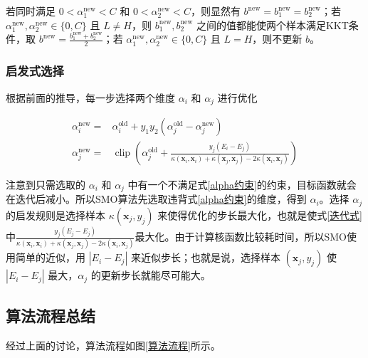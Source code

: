 \documentclass{ctexart}
\begin{document}
	若同时满足 $0<\alpha_{1}^\text{new}<C$ 和 $0<\alpha_{2}^\text{new}<C$，则显然有 $b^\text{new}=b_1^\text{new}=b_2^\text{new}$；若 $\alpha_{1}^\text{new},\alpha_{2}^\text{new}\in\{0,C\}$ 且 $L\neq H$，则 $b_1^\text{new},b_2^\text{new}$ 之间的值都能使两个样本满足KKT条件，取 $b^\text{new}=\frac{b_1^\text{new}+b_2^\text{new}}{2}$；若 $\alpha_{1}^\text{new},\alpha_{2}^\text{new}\in\{0,C\}$ 且 $L= H$，则不更新 $b$。
	
	\subsubsection{启发式选择}
	
	根据前面的推导，每一步选择两个维度 $\alpha_{i}$ 和 $\alpha_{j}$ 进行优化
	
	\begin{equation}
		\begin{aligned}
			\alpha_{i}^\text{new}=&\alpha_{i}^\text{old}+y_1y_2(\alpha_{j}^\text{old}-\alpha_{j}^\text{new})\\
			\alpha_{j}^\text{new}=&\operatorname{clip}\left(\alpha_{j}^\text{old}+\frac{y_j(E_i-E_j)}{\kappa(\boldsymbol{x}_i,\boldsymbol{x}_i)+\kappa(\boldsymbol{x}_j,\boldsymbol{x}_j)-2\kappa(\boldsymbol{x}_i,\boldsymbol{x}_j)}\right)
		\end{aligned}
	\end{equation}
	
	注意到只需选取的 $\alpha_{i}$ 和 $\alpha_{j}$ 中有一个不满足式\eqref{alpha约束}的约束，目标函数就会在迭代后减小。所以SMO算法先选取违背式\eqref{alpha约束}的维度，得到 $\alpha_{i}$。选择 $\alpha_{j}$ 的启发规则是选择样本 $\kappa(\boldsymbol{x}_j,y_j)$ 来使得优化的步长最大化，也就是使式\eqref{迭代式}中$\frac{y_j(E_j-E_j)}{\kappa(\boldsymbol{x}_i,\boldsymbol{x}_i)+\kappa(\boldsymbol{x}_j,\boldsymbol{x}_j)-2\kappa(\boldsymbol{x}_i,\boldsymbol{x}_j)}$最大化。由于计算核函数比较耗时间，所以SMO使用简单的近似，用 $|E_i-E_j|$ 来近似步长；也就是说，选择样本 $(\boldsymbol{x}_j,y_j)$ 使 $|E_i-E_j|$ 最大，$\alpha_{j}$ 的更新步长就能尽可能大。
	
	\subsection{算法流程总结}
	
	经过上面的讨论，算法流程如图\ref{算法流程}所示。
	
\end{document}

